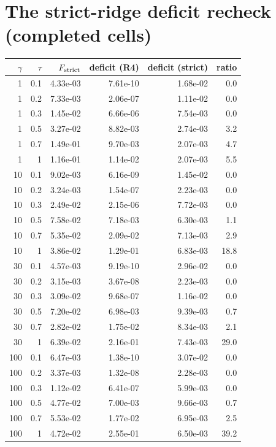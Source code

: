 \section{The strict-ridge deficit recheck (completed cells)}
{\small\begin{longtable}{rrrrrr}
\toprule
$\gamma$ & $\tau$ & $F_{\rm strict}$ & deficit (R4) & deficit (strict) & ratio \\
\midrule
\endhead
1 & 0.1 & 4.33e-03 & 7.61e-10 & 1.68e-02 & 0.0 \\
1 & 0.2 & 7.33e-03 & 2.06e-07 & 1.11e-02 & 0.0 \\
1 & 0.3 & 1.45e-02 & 6.66e-06 & 7.54e-03 & 0.0 \\
1 & 0.5 & 3.27e-02 & 8.82e-03 & 2.74e-03 & 3.2 \\
1 & 0.7 & 1.49e-01 & 9.70e-03 & 2.07e-03 & 4.7 \\
1 & 1 & 1.16e-01 & 1.14e-02 & 2.07e-03 & 5.5 \\
10 & 0.1 & 9.02e-03 & 6.16e-09 & 1.45e-02 & 0.0 \\
10 & 0.2 & 3.24e-03 & 1.54e-07 & 2.23e-03 & 0.0 \\
10 & 0.3 & 2.49e-02 & 2.15e-06 & 7.72e-03 & 0.0 \\
10 & 0.5 & 7.58e-02 & 7.18e-03 & 6.30e-03 & 1.1 \\
10 & 0.7 & 5.35e-02 & 2.09e-02 & 7.13e-03 & 2.9 \\
10 & 1 & 3.86e-02 & 1.29e-01 & 6.83e-03 & 18.8 \\
30 & 0.1 & 4.57e-03 & 9.19e-10 & 2.96e-02 & 0.0 \\
30 & 0.2 & 3.15e-03 & 3.67e-08 & 2.23e-03 & 0.0 \\
30 & 0.3 & 3.09e-02 & 9.68e-07 & 1.16e-02 & 0.0 \\
30 & 0.5 & 7.20e-02 & 6.98e-03 & 9.39e-03 & 0.7 \\
30 & 0.7 & 2.82e-02 & 1.75e-02 & 8.34e-03 & 2.1 \\
30 & 1 & 6.39e-02 & 2.16e-01 & 7.43e-03 & 29.0 \\
100 & 0.1 & 6.47e-03 & 1.38e-10 & 3.07e-02 & 0.0 \\
100 & 0.2 & 3.37e-03 & 1.32e-08 & 2.28e-03 & 0.0 \\
100 & 0.3 & 1.12e-02 & 6.41e-07 & 5.99e-03 & 0.0 \\
100 & 0.5 & 4.77e-02 & 7.00e-03 & 9.66e-03 & 0.7 \\
100 & 0.7 & 5.53e-02 & 1.77e-02 & 6.95e-03 & 2.5 \\
100 & 1 & 4.72e-02 & 2.55e-01 & 6.50e-03 & 39.2 \\

\end{longtable}}
